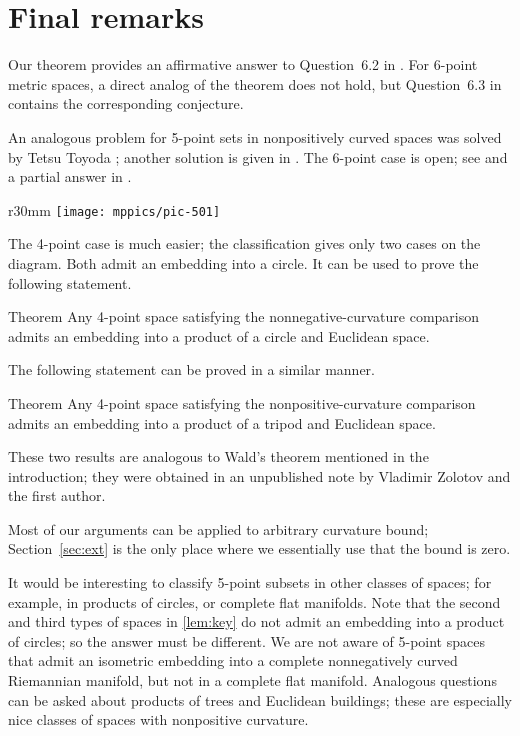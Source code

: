 \documentclass{article}
\begin{document}
\section{Final remarks}

Our theorem provides an affirmative answer to Question~6.2 in \cite{lebedeva-petrunin}.
For 6-point metric spaces, a direct analog of the theorem does not hold,
but Question~6.3 in \cite{lebedeva-petrunin} contains the corresponding conjecture.

An analogous problem for 5-point sets in nonpositively curved spaces was solved by Tetsu Toyoda \cite{toyoda}; another solution is given in \cite{lebedeva-petrunin}.
The 6-point case is open;
see  \cite[Question 6.1]{lebedeva-petrunin} and a partial answer in \cite{lebedeva-petrunin-octahedron}.

{

\begin{wrapfigure}{r}{30mm}
\vskip-3mm
\centering
\texttt{[image: mppics/pic-501]}
\end{wrapfigure}

The 4-point case is much easier;
the classification gives only two cases on the diagram.
Both admit an embedding into a circle.
It can be used to prove the following statement.

}

\begin{thm}{Theorem}
Any 4-point space satisfying the nonnegative-curvature comparison
admits an embedding into a product of a circle and Euclidean space.
\end{thm}

The following statement can be proved in a similar manner.

\begin{thm}{Theorem} Any 4-point space satisfying the nonpositive-curvature comparison admits an embedding into a product of a tripod and Euclidean space.
\end{thm}

These two results are analogous to Wald's theorem mentioned in the introduction;
they were obtained in an unpublished note by Vladimir Zolotov and the first author.

\medskip

Most of our arguments can be applied to arbitrary curvature bound;
Section~\ref{sec:ext} is the only place where we essentially use that the bound is zero.

It would be interesting to classify 5-point subsets in other classes of spaces;
for example, in products of circles, or complete flat manifolds.
Note that the second and third types of spaces in \ref{lem:key} do not admit an embedding into a product of circles; so the answer must be different.
We are not aware of 5-point spaces that admit an isometric embedding into a complete nonnegatively curved Riemannian manifold, but not in a complete flat manifold.
Analogous questions can be asked about products of trees and Euclidean buildings;
these are especially nice classes of spaces with nonpositive curvature.
\end{document}
